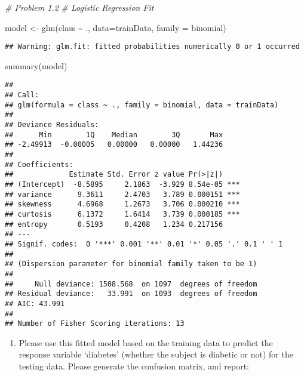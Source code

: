 \documentclass[
]{article}
\newenvironment{Shaded}{\begin{snugshade}}{\end{snugshade}}
\newcommand{\AttributeTok}[1]{\textcolor[rgb]{0.77,0.63,0.00}{#1}}
\newcommand{\CommentTok}[1]{\textcolor[rgb]{0.56,0.35,0.01}{\textit{#1}}}
\newcommand{\FunctionTok}[1]{\textcolor[rgb]{0.00,0.00,0.00}{#1}}
\newcommand{\NormalTok}[1]{#1}
\newcommand{\OtherTok}[1]{\textcolor[rgb]{0.56,0.35,0.01}{#1}}
\newcommand{\SpecialCharTok}[1]{\textcolor[rgb]{0.00,0.00,0.00}{#1}}
\providecommand{\tightlist}{%
  \setlength{\itemsep}{0pt}\setlength{\parskip}{0pt}}
\begin{document}
\begin{Shaded}
\begin{Highlighting}[]
\CommentTok{\# Problem 1.2}
\CommentTok{\# Logistic Regression Fit}

\NormalTok{model }\OtherTok{\textless{}{-}} \FunctionTok{glm}\NormalTok{(class }\SpecialCharTok{\textasciitilde{}}\NormalTok{ ., }\AttributeTok{data=}\NormalTok{trainData, }\AttributeTok{family =}\NormalTok{ binomial)}
\end{Highlighting}
\end{Shaded}

\begin{verbatim}
## Warning: glm.fit: fitted probabilities numerically 0 or 1 occurred
\end{verbatim}

\begin{Shaded}
\begin{Highlighting}[]
\FunctionTok{summary}\NormalTok{(model)}
\end{Highlighting}
\end{Shaded}

\begin{verbatim}
## 
## Call:
## glm(formula = class ~ ., family = binomial, data = trainData)
## 
## Deviance Residuals: 
##      Min        1Q    Median        3Q       Max  
## -2.49913  -0.00005   0.00000   0.00000   1.44236  
## 
## Coefficients:
##             Estimate Std. Error z value Pr(>|z|)    
## (Intercept)  -8.5895     2.1863  -3.929 8.54e-05 ***
## variance      9.3611     2.4703   3.789 0.000151 ***
## skewness      4.6968     1.2673   3.706 0.000210 ***
## curtosis      6.1372     1.6414   3.739 0.000185 ***
## entropy       0.5193     0.4208   1.234 0.217156    
## ---
## Signif. codes:  0 '***' 0.001 '**' 0.01 '*' 0.05 '.' 0.1 ' ' 1
## 
## (Dispersion parameter for binomial family taken to be 1)
## 
##     Null deviance: 1508.568  on 1097  degrees of freedom
## Residual deviance:   33.991  on 1093  degrees of freedom
## AIC: 43.991
## 
## Number of Fisher Scoring iterations: 13
\end{verbatim}

\begin{enumerate}
\def\labelenumi{(\alph{enumi})}
\setcounter{enumi}{2}
\tightlist
\item
  Please use this fitted model based on the training data to predict the
  response variable `diabetes' (whether the subject is diabetic or not)
  for the testing data. Please generate the confusion matrix, and
  report:
\end{enumerate}
\end{document}
